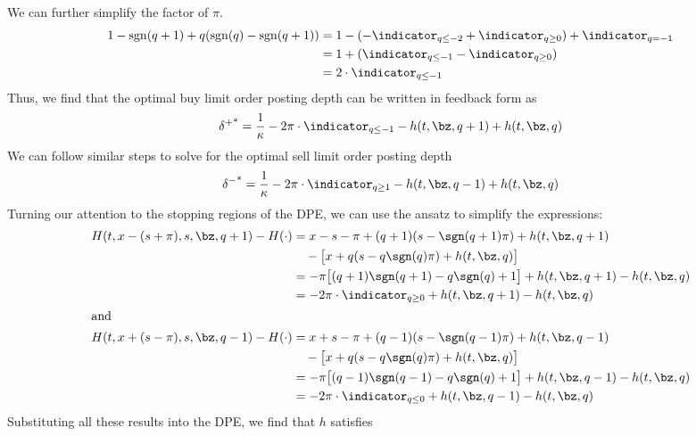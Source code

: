 \documentclass[12pt]{article}
\begin{document}
We can further simplify the factor of $\pi$.
\begin{align*}
1 - \mathrm{sgn}(q+1) + q(\mathrm{sgn}(q) - \mathrm{sgn}(q+1) )  & = 
1 - (- \indicator_{q \leq -2} + \indicator_{q \geq 0}) +  \indicator_{q = -1} \\
& = 1 + ( \indicator_{q \leq -1} -  \indicator_{q \geq 0} )\\
& = 2 \cdot \indicator_{q \leq -1}
\end{align*}
Thus, we find that the optimal buy limit order posting depth can be written in feedback form as
\begin{equation}
\label{eq:optbuydepthfeedback}
{\delta^+}^* = \frac{1}{\kappa} - 2 \pi \cdot \indicator_{q \leq -1} - h(t,\bz,q+1) + h(t,\bz,q) 
\end{equation}
We can follow similar steps to solve for the optimal sell limit order posting depth
\begin{equation}
\label{eq:optselldepthfeedback}
{\delta^-}^* = \frac{1}{\kappa} - 2 \pi \cdot \indicator_{q \geq 1} - h(t,\bz,q-1) + h(t,\bz,q) 
\end{equation}
Turning our attention to the stopping regions of the DPE, we can use the ansatz to simplify the expressions:
\begin{align*}
H(t,x-(s+\pi), s, \bz, q+1) - H(\cdot) & = x - s - \pi + (q+1)(s - \sgn(q+1)\pi) + h(t, \bz, q+1) \\
& \quad - \bigl[ x + q(s - q\sgn(q)\pi) + h(t,\bz,q) \bigr] \\
& = -\pi \bigl[ (q+1)\sgn(q+1) - q\sgn(q) + 1 \bigr] + h(t, \bz, q+1) - h(t,\bz,q)  \\
& = - 2 \pi \cdot \indicator_{q \geq 0} + h(t, \bz, q+1) - h(t,\bz,q) \\
\intertext{and}
H(t,x+(s-\pi), s, \bz, q-1) - H(\cdot) & = x + s - \pi + (q-1)(s - \sgn(q-1)\pi) + h(t, \bz, q-1)\\
& \quad - \bigl[ x + q(s - q\sgn(q)\pi) + h(t,\bz,q) \bigr] \\
& = - \pi \bigl[ (q-1)\sgn(q-1) - q\sgn(q) + 1 \bigr] + h(t, \bz, q-1) - h(t,\bz,q)  \\
& = -2 \pi \cdot \indicator_{q \leq 0} + h(t, \bz, q-1) - h(t,\bz,q) \\ 
\end{align*}
Substituting all these results into the DPE, we find that $h$ satisfies
\end{document}
